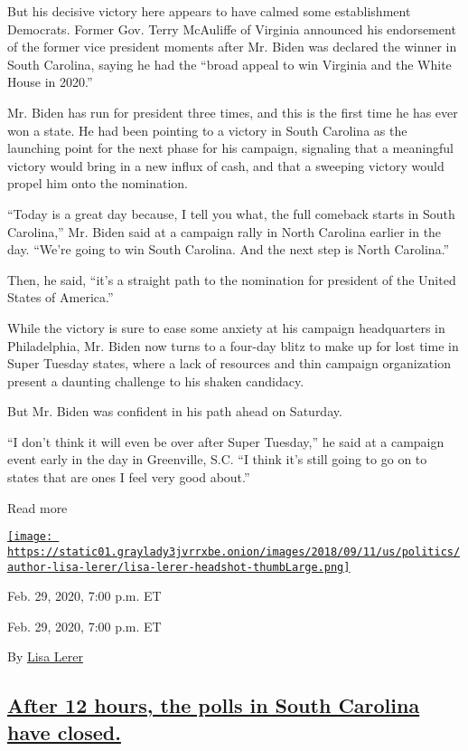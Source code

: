 But his decisive victory here appears to have calmed some establishment
Democrats. Former Gov. Terry McAuliffe of Virginia announced his
endorsement of the former vice president moments after Mr. Biden was
declared the winner in South Carolina, saying he had the ``broad appeal
to win Virginia and the White House in 2020.''

Mr. Biden has run for president three times, and this is the first time
he has ever won a state. He had been pointing to a victory in South
Carolina as the launching point for the next phase for his campaign,
signaling that a meaningful victory would bring in a new influx of cash,
and that a sweeping victory would propel him onto the nomination.

``Today is a great day because, I tell you what, the full comeback
starts in South Carolina,'' Mr. Biden said at a campaign rally in North
Carolina earlier in the day. ``We're going to win South Carolina. And
the next step is North Carolina.''

Then, he said, ``it's a straight path to the nomination for president of
the United States of America.''

While the victory is sure to ease some anxiety at his campaign
headquarters in Philadelphia, Mr. Biden now turns to a four-day blitz to
make up for lost time in Super Tuesday states, where a lack of resources
and thin campaign organization present a daunting challenge to his
shaken candidacy.

But Mr. Biden was confident in his path ahead on Saturday.

``I don't think it will even be over after Super Tuesday,'' he said at a
campaign event early in the day in Greenville, S.C. ``I think it's still
going to go on to states that are ones I feel very good about.''

Read more

\href{https://www.nytimes3xbfgragh.onion/by/lisa-lerer}{\texttt{[image: https://static01.graylady3jvrrxbe.onion/images/2018/09/11/us/politics/author-lisa-lerer/lisa-lerer-headshot-thumbLarge.png]}}

Feb. 29, 2020, 7:00 p.m. ET

Feb. 29, 2020, 7:00 p.m. ET

By \href{https://www.nytimes3xbfgragh.onion/by/lisa-lerer}{Lisa Lerer}

\hypertarget{after-12-hours-the-polls-in-south-carolina-have-closed}{%
\subsection{\texorpdfstring{\protect\hyperlink{after-12-hours-the-polls-in-south-carolina-have-closed}{After
12 hours, the polls in South Carolina have
closed.}}{After 12 hours, the polls in South Carolina have closed.}}\label{after-12-hours-the-polls-in-south-carolina-have-closed}}

